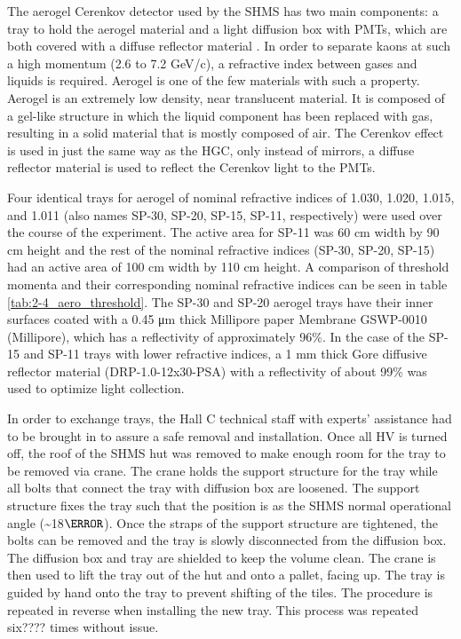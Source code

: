 \documentclass[
]{report}
\begin{document}


The aerogel Cerenkov detector used by the SHMS has two main components:
a tray to hold the aerogel material and a light diffusion box with PMTs,
which are both covered with a diffuse reflector material
\cite{horn_aerogel_2017}. In order to separate kaons at such a high
momentum (2.6 to 7.2 GeV/c), a refractive index between gases and
liquids is required. Aerogel is one of the few materials with such a
property. Aerogel is an extremely low density, near translucent
material. It is composed of a gel-like structure in which the liquid
component has been replaced with gas, resulting in a solid material that
is mostly composed of air. The Cerenkov effect is used in just the same
way as the HGC, only instead of mirrors, a diffuse reflector material is
used to reflect the Cerenkov light to the PMTs.



Four identical trays for aerogel of nominal refractive indices of 1.030,
1.020, 1.015, and 1.011 (also names SP-30, SP-20, SP-15, SP-11,
respectively) were used over the course of the experiment. The active
area for SP-11 was 60 cm width by 90 cm height and the rest of the
nominal refractive indices (SP-30, SP-20, SP-15) had an active area of
100 cm width by 110 cm height. A comparison of threshold momenta and
their corresponding nominal refractive indices can be seen in table
\ref{tab:2-4_aero_threshold}. The SP-30 and SP-20 aerogel trays have
their inner surfaces coated with a 0.45 μm thick Millipore paper
Membrane GSWP-0010 (Millipore), which has a reflectivity of
approximately 96\%. In the case of the SP-15 and SP-11 trays with lower
refractive indices, a 1 mm thick Gore diffusive reflector material
(DRP-1.0-12x30-PSA) with a reflectivity of about 99\% was used to
optimize light collection.



In order to exchange trays, the Hall C technical staff with experts'
assistance had to be brought in to assure a safe removal and
installation. Once all HV is turned off, the roof of the SHMS hut was
removed to make enough room for the tray to be removed via crane. The
crane holds the support structure for the tray while all bolts that
connect the tray with diffusion box are loosened. The support structure
fixes the tray such that the position is as the SHMS normal operational
angle (\textasciitilde18\(\degree\)). Once the straps of the support
structure are tightened, the bolts can be removed and the tray is slowly
disconnected from the diffusion box. The diffusion box and tray are
shielded to keep the volume clean. The crane is then used to lift the
tray out of the hut and onto a pallet, facing up. The tray is guided by
hand onto the tray to prevent shifting of the tiles. The procedure is
repeated in reverse when installing the new tray. This process was
repeated six???? times without issue.
\end{document}
